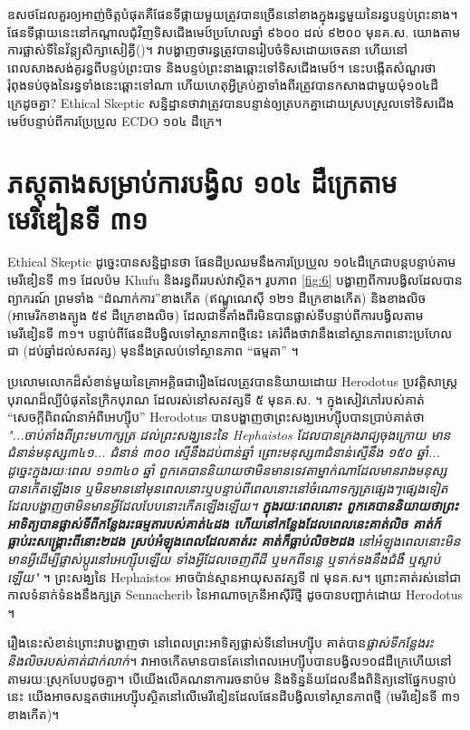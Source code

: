 \documentclass[10pt,twocolumn,letterpaper]{article}
\begin{document}
ឧសថដែលគួរឲ្យអាញ់ចិត្តបំផុតគឺផែនទីផ្កាយមួយត្រូវបានច្រេីននៅខាងក្នុងរន្ធមួយនៃរន្ធបន្ទប់ព្រះនាង។ ផែនទីផ្កាយនេះនៅកណ្តាលជុំវិញទិសជើងមេឋ៍ប្រហែលឆ្នាំ ៩៦០០ ដល់ ៩២០០ មុនគ.ស. យោងតាមការផ្លាស់ទីនៃវ័ន្ត្យសិក្សាសៀគ្វី(\cite{28})។ វាបង្ហាញថារន្ធត្រូវបានរៀបចំទិសដោយចេតនា ហើយនៅពេលសាងសង់គូរន្ធពីបន្ទប់ព្រះបាទ និងបន្ទប់ព្រះនាងឆ្ពោះទៅទិសជើងមេឋ៍។ នេះបង្កើតសំណួរថា រុំពុងទប់ចុងនៃរន្ធទាំងនេះឆ្ពោះទៅណា ហើយហេតុអ្វីគ្រប់គ្នាទាំងពីរត្រូវបានកសាងជាមួយមុំ១០៤ដឺក្រេដូចគ្នា? Ethical Skeptic សន្និដ្ឋានថាវាត្រូវបានបន្ទាន់ឲ្យត្របកគ្នាដោយស្របស្រួលទៅទិសជើងមេឋ៍បន្ទាប់ពីការប្រែប្រួល ECDO ១០៤ ដឺក្រេ។

\section{ភស្តុតាងសម្រាប់ការបង្វិល ១០៤ ដឺក្រេតាមមេរិឌៀនទី ៣១}

Ethical Skeptic ដូច្នេះបានសន្និដ្ឋានថា ផែនដីប្រឈមនឹងការប្រែប្រួល ១០៤​ដឺក្រេជាបន្តបន្ទាប់​តាមមេរីឌៀនទី ៣១ ដែលប៉ម Khufu និងរន្ធពីររបស់វាស្ថិត។ រូបភាព \ref{fig:6} បង្ហាញពីការបង្វិលដែលបានព្យាករណ៍ ព្រមទាំង “ដំណាក់ការ”ខាងកើត (ឥណ្ឌូណេស៊ី ១២១ ដឺក្រេខាងកើត) និងខាងលិច (អាមេរិកខាងត្បូង ៥៩ ដឺក្រេខាងលិច) ដែលជាទីតាំងពីរមិនបានផ្លាស់ទីបន្ទាប់ពីការបង្វិលតាមមេរីឌៀនទី ៣១។ បន្ទាប់ពីផែនដីបង្វិលទៅស្ថានភាពថ្មីនេះ គេរំពឹងថាវានឹងនៅស្ថានភាពនោះប្រហែលជា (ដប់ឆ្នាំដល់សតវត្ស) មុននឹងត្រលប់ទៅស្ថានភាព “ធម្មតា” \cite{150}។

ប្រលោមលោកដ៏សំខាន់មួយនៃគ្រាអគ្គិធជារឿងដែលត្រូវបាននិយាយដោយ Herodotus ប្រវត្តិសាស្រ្តបុរាណដ៏ល្បីបំផុតនៃក្រិកបុរាណ ដែលរស់នៅសតវត្សទី ៥ មុនគ.ស. \cite{31}។ ក្នុងសៀវភៅរបស់គាត់ “សេចក្តីពិពណ៌នាអំពីអេហ្ស៊ីប” Herodotus បានបង្ហាញថាព្រះសង្ឃអេហ្ស៊ីបបានប្រាប់គាត់ថា \textit{"...ចាប់តាំងពីព្រះមហាក្សត្រ ដល់ព្រះសង្ឃនេះនៃ Hephaistos ដែលបានគ្រងរាជ្យចុងក្រោយ មានជំនាន់មនុស្ស៣៤១... ជំនាន់ ៣០០ ស្មើនឹងដប់ពាន់ឆ្នាំ ព្រោះមនុស្ស៣ជំនាន់ស្មើនឹង ១៥០ ឆ្នាំ... ដូច្នេះក្នុងរយៈពេល ១១៣៤០ ឆ្នាំ ពួកគេបាននិយាយថាមិនមានទេវតាម្នាក់ណាដែលមានរាងមនុស្សបានកើតឡើងទេ ឬមិនមាននៅមុនពេលនោះឬបន្ទាប់ពីពេលនោះនៅចំណោទក្សត្រផ្សេងៗផ្សេងទៀត ដែលបង្ហាញថាមិនមានអ្វីដែលបែបនោះកើតឡើងឡើយ។ \textbf{ក្នុងរយៈពេលនោះ ពួកគេបាននិយាយថាព្រះអាទិត្យបានផ្លាស់ទីពីកន្លែងរះធម្មតារបស់គាត់៤ដង ហើយនៅកន្លែងដែលពេលនេះគាត់លិច គាត់ក៍ធ្លាប់រះសង្រ្គោះពីនោះ២ដង ស្រប់អំឡុងពេលដែលគាត់រះ គាត់ក៏ធ្លាប់លិច២ដង} នៅអំឡុងពេលនោះមិនមានអ្វីដើម្បីផ្លាស់ប្តូរនៅអេហ្ស៊ីបឡើយ ទាំងអ្វីដែលចេញពីដី ឬមកពីទន្លេ ឬទាក់ទងនឹងជំងឺ ឬស្លាប់ឡើយ"} \cite{32}។ ព្រះសង្ឃនៃ Hephaistos អាចប៉ាន់ស្មានអាយុសតវត្សទី ៧ មុនគ.ស។ ព្រោះគាត់រស់នៅជាកាលទំនាក់ទំនងនឹងក្សត្រ Sennacherib នៃអាណាចក្រនីអាស៊ីរីថ្មី ដូចបានបញ្ជាក់ដោយ Herodotus \cite{32,33,34}។

រឿងនេះសំខាន់ព្រោះវាបង្ហាញថា នៅពេលព្រះអាទិត្យផ្លាស់ទីនៅអេហ្ស៊ីប គាត់បាន\textit{ផ្លាស់ទីកន្លែងរះនិងលិចរបស់គាត់ជាក់លាក់}។ វាអាចកើតមានបានតែនៅពេលអេហ្ស៊ីបបានបង្វិល១០៨ដឺក្រេហើយនៅតាមរយៈស្រុកបែបដូចគ្នា។ បើយើងលើគណនាការរចនាប៉ម និងទិន្នន័យដែលនឹងពិនិត្យនៅផ្នែកបន្ទាប់នេះ យើងអាចសន្មតថាអេហ្ស៊ីបស្ថិតនៅលើមេរីឌៀនដែលផែនដីបង្វិលទៅស្ថានភាពថ្មី (មេរីឌៀនទី ៣១ ខាងកើត)។
\end{document}
